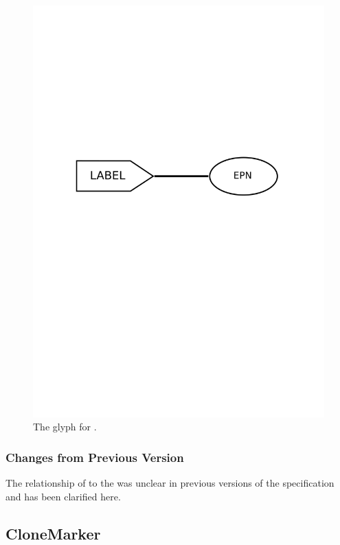 \begin{figure}[H]
  \centering
  \includegraphics[scale = 0.4]{images/equivalence}
  \caption{The \PD glyph for .}
  \label{fig:equivalence}
\end{figure}

\subsubsection{Changes from Previous Version}

The relationship of  to the
 was unclear in previous versions of the
specification and has been clarified here.

\subsection{CloneMarker}
\label{defn:CloneMarker}
\label{sec:cloneMarker}

